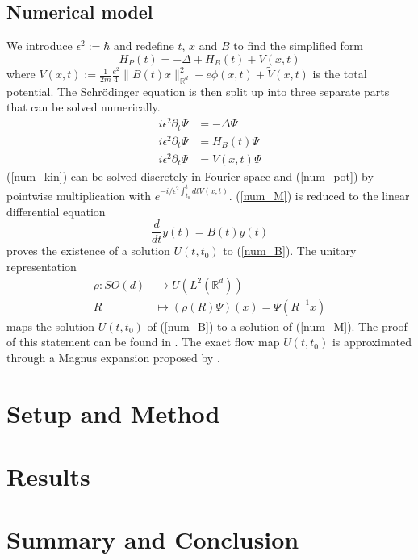 \documentclass{article}
\begin{document}
\subsection{Numerical model}
We introduce $\epsilon ^2 := \hbar$ and redefine $t$, $x$ and $B$ to find the simplified form
\begin{equation}
  H_P(t) = -\Delta + H_B(t) + V(x,t)
\end{equation}
where $V(x,t) := \frac{1}{2m}\frac{e^{2}}{4}\|B(t) x\|_{\mathbb{R}^{d}}^{2} + e \phi(x,t) + \tilde{V}(x,t)$ is the total potential.
The Schr{\"o}dinger equation is then split up into three separate parts that can be solved numerically.
\begin{align}
  i \epsilon^2 \partial_t \Psi &= -\Delta \Psi \label{num_kin} \tag{K}\\
  i \epsilon^2 \partial_t \Psi &= H_B(t) \Psi \label{num_M} \tag{M}\\
  i \epsilon^2 \partial_t \Psi &= V(x,t) \Psi \label{num_pot} \tag{P}
\end{align}
(\ref{num_kin}) can be solved discretely in Fourier-space and (\ref{num_pot}) by pointwise multiplication with $e^{-i/\epsilon ^2 \int_{t_0}^t dt V(x,t)}$. (\ref{num_M}) is reduced to the linear differential equation
\begin{equation} \label{num_B} \tag{B}
  \frac{d}{dt}y(t) = B(t)y(t)
\end{equation}
\cite{simon_reed} proves the existence of a solution $U(t,t_0)$ to (\ref{num_B}). The unitary representation
\begin{align}
  \rho : SO(d) &\longrightarrow U(L^2(\mathbb{R}^d)) \\
  R &\longmapsto (\rho (R)\Psi)(x) = \Psi(R^{-1} x)
\end{align}
maps the solution $U(t, t_0)$ of (\ref{num_B}) to a solution of (\ref{num_M}). The proof of this statement can be found in \cite{paper_orvg}. The exact flow map $U(t, t_0)$ is approximated through a Magnus expansion proposed by \cite{magnus_integrators}.


\section{Setup and Method}

\section{Results}

\section{Summary and Conclusion}
\end{document}
